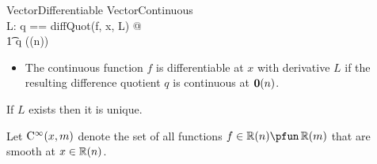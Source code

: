 \documentclass[11pt, oneside]{article}
\begin{document}
\begin{schema}{VectorDifferentiable}
VectorContinuous \\
L: \Rinf \pfun \Rinf
\where
\LET q == diffQuot(f, x, L) @ \\
\t1	q \in \CzeroPointRtup(\zeroRtup(n))
\end{schema}

\begin{itemize}
\item The continuous function $f$ is differentiable at $x$ with derivative $L$ if the resulting
difference quotient $q$ is continuous at $\operatorname{\mathbf{0}}(n)$.
\end{itemize}

\begin{remark}
If $L$ exists then it is unique.
\end{remark}


Let $\operatorname{C^\infty}(x,m)$ denote the set of all functions $f \in \Rtup(n) \pfun \Rtup(m)$ that are smooth at $x \in \operatorname{\mathbb{R}}(n)$.

\end{document}
